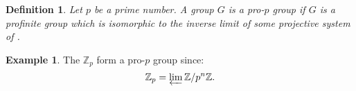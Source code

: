 \documentclass[12pt]{article}
\newtheorem*{defn}{Definition}
\theoremstyle{definition}
\newtheorem*{exa}{Example}
\newcommand{\Ints}{\mathbb{Z}}
\begin{document}
\begin{defn}
Let $p$ be a prime number. A group $G$ is a pro-$p$ group if $G$ is a profinite group which is isomorphic to the inverse limit of some projective system of . 
\end{defn}

\begin{exa}
The  $\Ints_p$ form a pro-$p$ group since:
$$\Ints_p=\varprojlim \Ints/p^n\Ints.$$
\end{exa}
\end{document}
